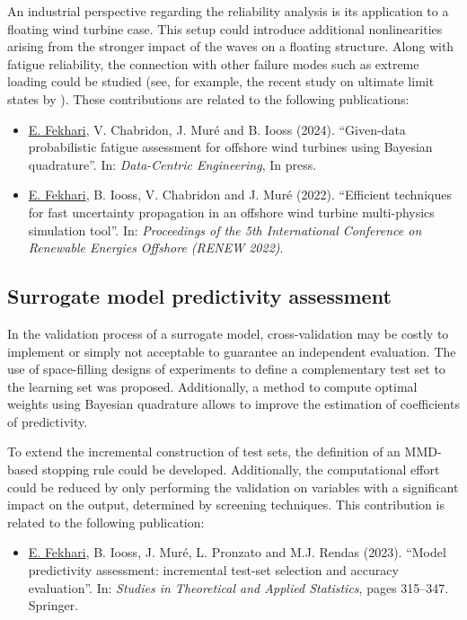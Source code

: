 An industrial perspective regarding the reliability analysis is its application to a floating wind turbine case. 
This setup could introduce additional nonlinearities arising from the stronger impact of the waves on a floating structure. 
Along with fatigue reliability, the connection with other failure modes such as extreme loading could be studied (see, for example, the recent study on ultimate limit states by \citealp{wang_schar_2023_uls}). 
These contributions are related to the following publications:
\begin{itemize}
    \footnotesize
    \item[\ding{125}] \underline{E. Fekhari}, V. Chabridon, J. Muré and B. Iooss (2024). ``Given-data probabilistic fatigue assessment for offshore wind turbines using Bayesian quadrature''. In: \textit{Data-Centric Engineering}, In press.
    \item[\ding{125}] \underline{E. Fekhari}, B. Iooss, V. Chabridon and J. Muré (2022). ``Efficient techniques for fast uncertainty propagation in an offshore wind turbine multi-physics simulation tool''. In: \textit{Proceedings of the 5th International Conference on Renewable Energies Offshore (RENEW 2022)}.
\end{itemize}

\subsection*{Surrogate model predictivity assessment}

In the validation process of a surrogate model, cross-validation may be costly to implement or simply not acceptable to guarantee an independent evaluation.  
The use of space-filling designs of experiments to define a complementary test set to the learning set was proposed. 
Additionally, a method to compute optimal weights using Bayesian quadrature allows to improve the estimation of coefficients of predictivity. 

To extend the incremental construction of test sets, the definition of an MMD-based stopping rule could be developed. 
Additionally, the computational effort could be reduced by only performing the validation on variables with a significant impact on the output, determined by screening techniques. 
This contribution is related to the following publication:
\begin{itemize}
    \footnotesize
    \item[\ding{125}] \underline{E. Fekhari}, B. Iooss, J. Muré, L. Pronzato and M.J. Rendas (2023). ``Model predictivity assessment: incremental test-set selection and accuracy evaluation''. In: \textit{Studies in Theoretical and Applied Statistics}, pages 315--347. Springer.
\end{itemize}

